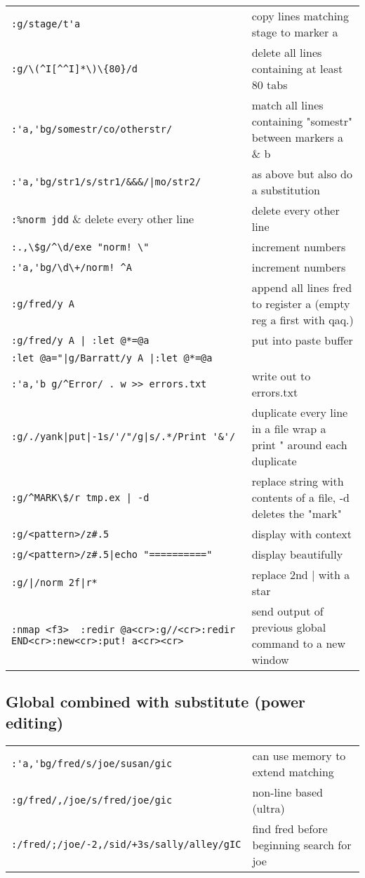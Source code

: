 \begin{center}
\begin{longtable}{l|l}
 \verb!:g/stage/t'a! & copy lines matching stage to marker a\\
 \verb!:g/\(^I[^^I]*\)\{80}/d! & delete all lines containing at least 80 tabs\\
 \verb!:'a,'bg/somestr/co/otherstr/! & match all lines containing "somestr" between markers a \& b\\
 \verb!:'a,'bg/str1/s/str1/&&&/|mo/str2/! & as above but also do a substitution\\
 \verb!:%norm jdd! & delete every other line\\
 \verb?:.,\$g/^\d/exe "norm! \"? & increment numbers\\
 \verb?:'a,'bg/\d\+/norm! ^A? & increment numbers\\
 \verb!:g/fred/y A! & append all lines fred to register a (empty reg a first with qaq.) \\
 \verb!:g/fred/y A | :let @*=@a! & put into paste buffer\\
 \verb!:let @a="|g/Barratt/y A |:let @*=@a! & \\
 \verb!:'a,'b g/^Error/ . w >> errors.txt! & write out to errors.txt\\
 \verb!:g/./yank|put|-1s/'/"/g|s/.*/Print '&'/! & duplicate every line in a file wrap a print " around each duplicate\\
 \verb!:g/^MARK\$/r tmp.ex | -d! & replace string with contents of a file, -d deletes the "mark"\\
 \verb!:g/<pattern>/z#.5! & display with context\\
 \verb!:g/<pattern>/z#.5|echo "=========="! & display beautifully\\
 \verb!:g/|/norm 2f|r*! & replace 2nd | with a star\\
 \verb?:nmap <f3>  :redir @a<cr>:g//<cr>:redir END<cr>:new<cr>:put! a<cr><cr>? & send output of previous global command to a new window
\end{longtable}
\end{center}

\subsection{Global combined with substitute (power editing)}
\begin{center}
\begin{longtable}{l|l}
 \verb!:'a,'bg/fred/s/joe/susan/gic! & can use memory to extend matching\\
 \verb!:g/fred/,/joe/s/fred/joe/gic! & non-line based (ultra)\\
 \verb!:/fred/;/joe/-2,/sid/+3s/sally/alley/gIC! & find fred before beginning search for joe
\end{longtable}
\end{center}

